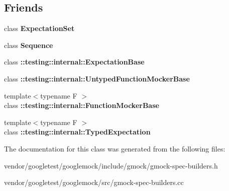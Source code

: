 \subsection*{Friends}
\begin{DoxyCompactItemize}
\item 
\mbox{\label{classtesting_1_1_expectation_acf5c2877a449d4ad1889ee5833ebb193}} 
class {\bfseries Expectation\+Set}
\item 
\mbox{\label{classtesting_1_1_expectation_a26271d5afaff6e6d3f00c055c63d0b24}} 
class {\bfseries Sequence}
\item 
\mbox{\label{classtesting_1_1_expectation_a9a45d4d807ed262ab76ab842b8d33761}} 
class {\bfseries \+::testing\+::internal\+::\+Expectation\+Base}
\item 
\mbox{\label{classtesting_1_1_expectation_a709c2d6bee1223cfbcadc58e884cdb4b}} 
class {\bfseries \+::testing\+::internal\+::\+Untyped\+Function\+Mocker\+Base}
\item 
\mbox{\label{classtesting_1_1_expectation_a92066c162835b0d3d2317c9643a87e7e}} 
{\footnotesize template$<$typename F $>$ }\\class {\bfseries \+::testing\+::internal\+::\+Function\+Mocker\+Base}
\item 
\mbox{\label{classtesting_1_1_expectation_a86c4872d3edbede5e8ac148525bc8893}} 
{\footnotesize template$<$typename F $>$ }\\class {\bfseries \+::testing\+::internal\+::\+Typed\+Expectation}
\end{DoxyCompactItemize}


The documentation for this class was generated from the following files\+:\begin{DoxyCompactItemize}
\item 
vendor/googletest/googlemock/include/gmock/gmock-\/spec-\/builders.\+h\item 
vendor/googletest/googlemock/src/gmock-\/spec-\/builders.\+cc\end{DoxyCompactItemize}
